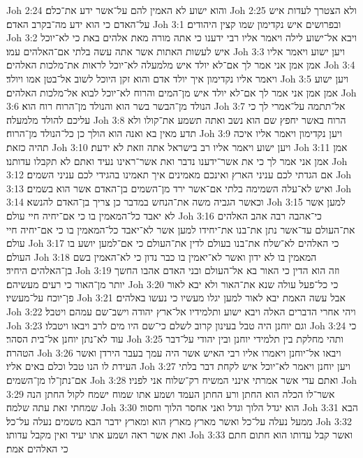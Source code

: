 Joh 2:24  והוא ישוע לא האמין להם על־אשר ידע את־כלם׃
Joh 2:25  ולא הצטרך לעדות איש על־האדם כי הוא ידע מה־בקרב האדם׃
Joh 3:1  ובפרושים איש נקדימון שמו קצין היהודים׃
Joh 3:2  ויבא אל־ישוע לילה ויאמר אליו רבי ידענו כי אתה מורה מאת אלהים באת כי לא־יוכל איש לעשות האתות אשר אתה עשה בלתי אם־האלהים עמו׃
Joh 3:3  ויען ישוע ויאמר אליו אמן אמן אני אמר לך אם־לא יולד איש מלמעלה לא־יוכל לראות את־מלכות האלהים׃
Joh 3:4  ויאמר אליו נקדימון איך יולד אדם והוא זקן היוכל לשוב אל־בטן אמו ויולד׃
Joh 3:5  ויען ישוע אמן אמן אני אמר לך אם־לא יולד איש מן־המים והרוח לא־יוכל לבוא אל־מלכות האלהים׃
Joh 3:6  הנולד מן־הבשר בשר הוא והנולד מן־הרוח רוח הוא׃
Joh 3:7  אל־תתמה על־אמרי לך כי עליכם להולד מלמעלה׃
Joh 3:8  הרוח באשר יחפץ שם הוא נשב ואתה תשמע את־קולו ולא תדע מאין בא ואנה הוא הולך כן כל־הנולד מן־הרוח׃
Joh 3:9  ויען נקדימון ויאמר אליו איכה תהיה כזאת׃
Joh 3:10  ויען ישוע ויאמר אליו רב בישראל אתה וזאת לא ידעת׃
Joh 3:11  אמן אמן אני אמר לך כי את אשר־ידענו נדבר ואת אשר־ראינו נעיד ואתם לא תקבלו עדותנו׃
Joh 3:12  אם הגדתי לכם עניני הארץ ואינכם מאמינים איך תאמינו בהגידי לכם עניני השמים׃
Joh 3:13  ואיש לא־עלה השמימה בלתי אם־אשר ירד מן־השמים בן־האדם אשר הוא בשמים׃
Joh 3:14  וכאשר הגביה משה את־הנחש במדבר כן צריך בן־האדם להנשא׃
Joh 3:15  למען אשר לא יאבד כל־המאמין בו כי אם־יחיה חיי עולם׃
Joh 3:16  כי־אהבה רבה אהב האלהים את־העולם עד־אשר נתן את־בנו את־יחידו למען אשר לא־יאבד כל־המאמין בו כי אם־יחיה חיי עולם׃
Joh 3:17  כי האלהים לא־שלח את־בנו בעולם לדין את־העולם כי אם־למען יושע בו העולם׃
Joh 3:18  המאמין בו לא ידון ואשר לא־יאמין בו כבר נדון כי לא־האמין בשם בן־האלהים היחיד׃
Joh 3:19  וזה הוא הדין כי האור בא אל־העולם ובני האדם אהבו החשך יותר מן־האור כי רעים מעשיהם׃
Joh 3:20  כי כל־פעל עולה שנא את־האור ולא יבא לאור פן־יוכח על־מעשיו׃
Joh 3:21  אבל עשה האמת יבא לאור למען יגלו מעשיו כי נעשו באלהים׃
Joh 3:22  ויהי אחרי הדברים האלה ויבא ישוע ותלמידיו אל־ארץ יהודה וישב־שם עמהם ויטבל׃
Joh 3:23  וגם יוחנן היה טבל בעינון קרוב לשלם כי־שם היו מים לרב ויבאו ויטבלו׃
Joh 3:24  כי עוד לא־נתן יוחנן אל־בית הסהר׃
Joh 3:25  ותהי מחלקת בין תלמידי יוחנן ובין יהודי על־דבר הטהרה׃
Joh 3:26  ויבאו אל־יוחנן ויאמרו אליו רבי האיש אשר היה עמך בעבר הירדן ואשר העידת לו הנו טבל וכלם באים אליו׃
Joh 3:27  ויען יוחנן ויאמר לא־יוכל איש לקחת דבר בלתי אם־נתן־לו מן־השמים׃
Joh 3:28  ואתם עדי אשר אמרתי אינני המשיח רק־שלוח אני לפניו׃
Joh 3:29  אשר־לו הכלה הוא החתן ורע החתן העמד ושמע אתו שמוח ישמח לקול החתן הנה שמחתי זאת עתה שלמה׃
Joh 3:30  הוא יגדל הלוך וגדל ואני אחסר הלוך וחסור׃
Joh 3:31  הבא ממעל נעלה על־כל ואשר מארץ מארץ הוא ומארץ ידבר הבא משמים נעלה על־כל׃
Joh 3:32  ואת אשר ראה ושמע אתו יעיד ואין מקבל עדותו׃
Joh 3:33  ואשר קבל עדותו הוא חתום חתם כי האלהים אמת׃
